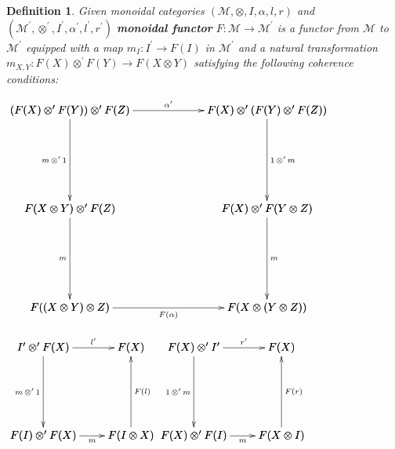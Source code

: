\documentclass{article}
\newtheorem{definition}[theorem]{Definition}
\let\mto\to
\let\to\relax
\newcommand{\to}{\rightarrow}
\newcommand{\cat}[1]{\mathcal{#1}}
\begin{document}
\begin{definition} Given monoidal categories $(\cat{M}, \otimes, I, \alpha, l, r)$ and $(\cat{M}^\prime, \otimes^\prime, I^\prime, \alpha^\prime, l^\prime, r^\prime)$ \textbf{monoidal functor} $F : \cat{M} \mto \cat{M}^\prime$ is a functor from $\cat{M}$ to $\cat{M}^\prime$ equipped with a map $m_I : I^\prime \mto F(I)$ in $\cat{M}^\prime$ and a natural transformation $m_{X,Y} : F(X) \otimes^\prime F(Y) \mto F(X \otimes Y)$ satisfying the following coherence conditions:
  \begin{center}
    \begin{math}
      \bfig
        \node botleft(0,0)[F((X \otimes Y) \otimes Z)]
        \node midleft(0,900)[F(X \otimes Y) \otimes^\prime F(Z)]
        \node topleft(0,1800)[(F(X) \otimes^\prime F(Y)) \otimes^\prime F(Z)]
        \node botright(1800,0)[F(X \otimes (Y \otimes Z))]
        \node midright(1800,900)[F(X) \otimes^\prime F(Y \otimes Z)]
        \node topright(1800,1800)[F(X) \otimes^\prime (F(Y) \otimes^\prime F(Z))]
        \arrow[topleft`midleft; m \, \otimes^\prime \, 1]
        \arrow[midleft`botleft; m]
        \arrow|b|[botleft`botright; F(\alpha)]
        \arrow[topleft`topright; \alpha^\prime]
        \arrow|r|[topright`midright; 1 \, \otimes^\prime\, m]
        \arrow|r|[midright`botright; m]
        \efig
    \end{math}
  \end{center}

  \begin{center}
    \begin{math}
      \bfig
      \square(0,0)/>`>`<-`>/<800,800>[I^\prime \otimes^\prime F(X)`F(X)`F(I)\otimes^\prime F(X)`F(I \otimes X);l^\prime`m \, \otimes^\prime \, 1`F(l)`m]
      \efig
      \bfig
      \square(0,0)/>`>`<-`>/<800,800>[F(X) \otimes^\prime I^\prime`F(X)`F(X)\otimes^\prime F(I)`F(X \otimes I);r^\prime`1 \, \otimes^\prime \, m`F(r)`m]
      \efig
    \end{math} 
  \end{center}
\end{definition}
\end{document}
